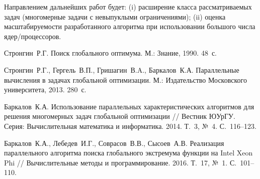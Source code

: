 \documentclass[11pt, oneside, a4paper]{article}
\begin{document}
Направлением дальнейших работ будет: (i) расширение класса рассматриваемых задач (многомерные задачи с невыпуклыми ограничениями); (ii) оценка масштабируемости разработанного алгоритма при использовании большого числа ядер/процессоров.


\begin{biblio}

Стронгин~Р.Г. Поиск глобального оптимума. М.: Знание, 1990. 48~с.


Стронгин~Р.Г., Гергель~В.П., Гришагин~В.A., Баркалов~К.А. Параллельные вычисления в задачах глобальной оптимизации. М.: Издательство Московского университета, 2013. 280~с.

Баркалов~К.А. Использование параллельных характеристических алгоритмов для решения многомерных задач глобальной оптимизации  // Вестник ЮУрГУ. Серия: Вычислительная математика и информатика. 2014. Т.~3, №~4. С.~116--123.

Баркалов~К.А., Лебедев~И.Г., Соврасов~В.В., Сысоев~А.В. Реализация параллельного алгоритма поиска глобального экстремума функции на Intel Xeon Phi // Вычислительные методы и программирование. 2016. Т.~17, №~1. С.~101--110.



\end{biblio}
\end{document}
